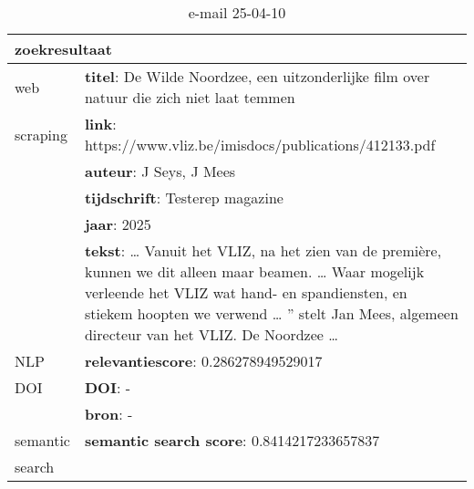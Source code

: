 \begin{table}[h!]
    \caption{e-mail 25-04-10}
    \centering
    \begin{tabularx}{\textwidth}{|p{4cm}|X|} 
        \hline
        \multicolumn{2}{|X|}{\textbf{zoekresultaat}} \\
        \hline
        web &\textbf{titel}: De Wilde Noordzee, een uitzonderlijke film over natuur die zich niet laat temmen\\
        scraping&\textbf{link}: https://www.vliz.be/imisdocs/publications/412133.pdf\\
        &\textbf{auteur}:  J Seys, J Mees\\
        &\textbf{tijdschrift}: Testerep magazine\\
        &\textbf{jaar}: 2025\\
        &\textbf{tekst}: … Vanuit het VLIZ, na het zien van de première, kunnen we dit alleen maar beamen. … Waar mogelijk verleende het VLIZ wat hand- en spandiensten, en stiekem hoopten we verwend … ” stelt Jan Mees, algemeen directeur van het VLIZ. De Noordzee …\\
        \hline
        NLP&\textbf{relevantiescore}: 0.286278949529017\\
        \hline
        DOI&\textbf{DOI}: -\\
        &\textbf{bron}: -\\
        \hline
        semantic&\textbf{semantic search score}: 0.8414217233657837\\
        search&\\
        \hline
    \end{tabularx}
    \label{table:email20250410}
\end{table}
